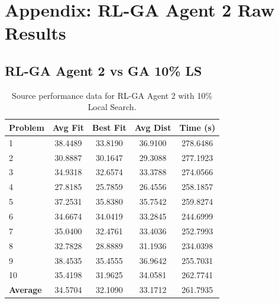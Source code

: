 \newpage
\section{Appendix: RL-GA Agent 2 Raw Results}
\subsection{RL-GA Agent 2 vs GA 10\% LS}
\begin{table}[H]
\centering
\small
\begin{tabular}{lcccc}
\toprule
\textbf{Problem} & \textbf{Avg Fit} & \textbf{Best Fit} & \textbf{Avg Dist} & \textbf{Time (s)} \\
\midrule
1  & 38.4489 & 33.8190 & 36.9100 & 278.6486 \\
2  & 30.8887 & 30.1647 & 29.3088 & 277.1923 \\
3  & 34.9318 & 32.6574 & 33.3788 & 274.0566 \\
4  & 27.8185 & 25.7859 & 26.4556 & 258.1857 \\
5  & 37.2531 & 35.8380 & 35.7542 & 259.8274 \\
6  & 34.6674 & 34.0419 & 33.2845 & 244.6999 \\
7  & 35.0400 & 32.4761 & 33.4036 & 252.7993 \\
8  & 32.7828 & 28.8889 & 31.1936 & 234.0398 \\
9  & 38.4535 & 35.4555 & 36.9642 & 255.7031 \\
10 & 35.4198 & 31.9625 & 34.0581 & 262.7741 \\
\midrule
\textbf{Average} & 34.5704 & 32.1090 & 33.1712 & 261.7935 \\
\bottomrule
\end{tabular}
\caption{Source performance data for RL-GA Agent 2 with 10\% Local Search.}
\label{tab:rl_10ls_source}
\end{table}

